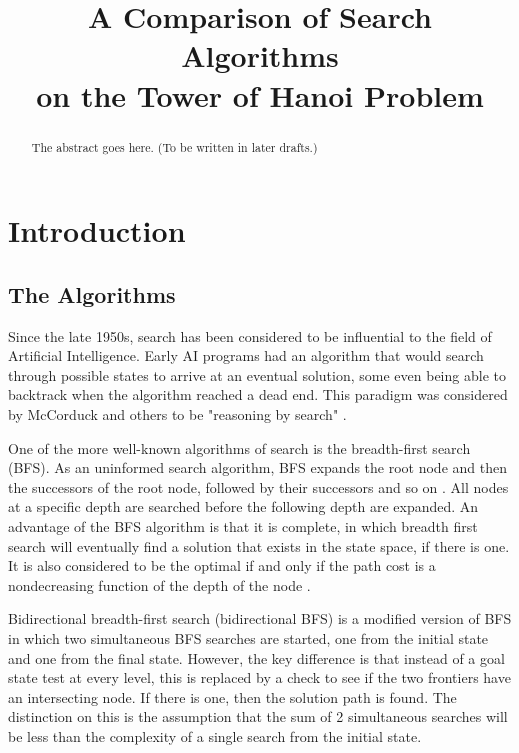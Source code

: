 \documentclass[conference]{IEEEtran}
\begin{document}
\title{A Comparison of Search Algorithms\\ on the Tower of Hanoi Problem  }

\author{
}
\maketitle

\begin{abstract}
The abstract goes here.
(To be written in later drafts.)
\end{abstract}

\section{Introduction}

\subsection{The Algorithms}
Since the late 1950s, search has been considered to be influential to the field of Artificial Intelligence. Early AI programs had an algorithm that would search through possible states to arrive at an eventual solution, some even being able to backtrack when the algorithm reached a dead end. This paradigm was considered by McCorduck and others to be "reasoning by search" \cite{McCorduck01}. 

One of the more well-known algorithms of search is the breadth-first search (BFS). As an uninformed search algorithm, BFS expands the root node and then the successors of the root node, followed by their successors and so on \cite{Textbook01}. All nodes at a specific depth are searched before the following depth are expanded. An advantage of the BFS algorithm is that it is complete, in which breadth first search will eventually find a solution that exists in the state space, if there is one. It is also considered to be the optimal if and only if the path cost is a nondecreasing function of the depth of the node \cite{Textbook01}.

Bidirectional breadth-first search (bidirectional BFS) is a modified version of BFS in which two simultaneous BFS searches are started, one from the initial state and one from the final state. However, the key difference is that instead of a goal state test at every level, this is replaced by a check to see if the two frontiers have an intersecting node. If there is one, then the solution path is found. The distinction on this is the assumption that the sum of 2 simultaneous searches will be less than the complexity of a single search from the initial state. 
\end{document}
